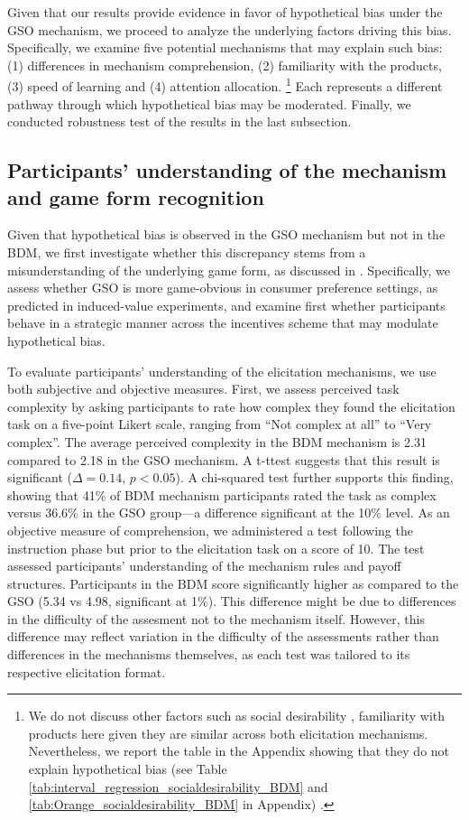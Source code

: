 \documentclass[12pt]{article}
\begin{document}
Given that our results provide evidence in favor of hypothetical bias under the GSO mechanism, we proceed to analyze the underlying factors driving this bias. Specifically, we examine five potential mechanisms that may explain such bias: (1) differences in mechanism comprehension,  (2) familiarity with the products,  (3) speed of learning and (4) attention allocation.  \footnote{We do not discuss other factors such as social desirability \citep{norwood2011social, entem2022using, lopez2021social, bursztyn2025social}, familiarity with products \citep{veettil_hypothetical_2024} here given they are similar across both elicitation mechanisms. Nevertheless, we report the table in the Appendix showing that they do not explain hypothetical bias (see Table \ref{tab:interval_regression_socialdesirability_BDM} and \ref{tab:Orange_socialdesirability_BDM}  in Appendix) .} Each represents a different pathway through which hypothetical bias may be moderated. Finally, we conducted robustness test of the results in the last subsection.


\subsection{Participants' understanding of the mechanism and game form recognition}

Given that hypothetical bias is observed in the GSO mechanism but not in the BDM, we first investigate whether this discrepancy stems from a misunderstanding of the underlying game form, as discussed in \citet{cason_misconceptions_2014}. Specifically, we assess whether GSO is more game-obvious in consumer preference settings, as predicted in induced-value experiments, and examine first whether participants behave in a strategic manner across the incentives scheme that may modulate hypothetical bias.

To evaluate participants’ understanding of the elicitation mechanisms, we use both subjective and objective measures. First, we assess perceived task complexity by asking participants to rate how complex they found the elicitation task on a five-point Likert scale, ranging from “Not complex at all” to “Very complex”. The average perceived complexity in the BDM mechanism is 2.31 compared to 2.18 in the GSO mechanism. A t-ttest suggests that this result is significant (\(\Delta = 0.14\), \(p < 0.05\)). A chi-squared test further supports this finding, showing that 41\% of BDM mechanism participants rated the task as complex versus 36.6\% in the GSO group—a difference significant at the 10\% level.
As an objective measure of comprehension, we administered a test following the instruction phase but prior to the elicitation task on a score of 10. The test assessed participants’ understanding of the mechanism rules and payoff structures. Participants in the BDM score significantly higher as compared to the GSO (5.34 vs 4.98, significant at 1\%). This difference might be due to differences in the difficulty of the assesment not to the mechanism itself. However, this difference may reflect variation in the difficulty of the assessments rather than differences in the mechanisms themselves, as each test was tailored to its respective elicitation format.
\end{document}

